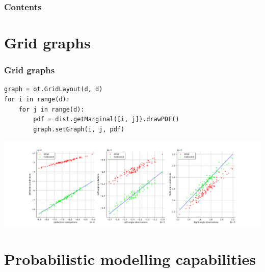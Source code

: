 \documentclass{beamer}
\begin{document}



\begin{frame}
\frametitle{Contents}
\tableofcontents
\end{frame}

\section{Grid graphs}
% 
\begin{frame}[containsverbatim]
\frametitle{Grid graphs}

\lstset{language=python}

% 
% 
% 
\begin{lstlisting}
graph = ot.GridLayout(d, d)
for i in range(d):
    for j in range(d):
        pdf = dist.getMarginal([i, j]).drawPDF()
        graph.setGraph(i, j, pdf)
\end{lstlisting}
% 
% 
%
\begin{center}
\includegraphics[width=1.0\textwidth]{figures/calib.png}
\end{center}
% 
\end{frame}

\section{Probabilistic modelling capabilities}

\end{document}
